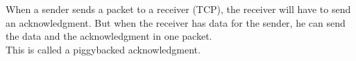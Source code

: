 When a sender sends a packet to a receiver (TCP), the receiver will have to send an acknowledgment.
But when the receiver has data for the sender, he can send the data and the acknowledgment in one packet. \\
This is called a piggybacked acknowledgment.